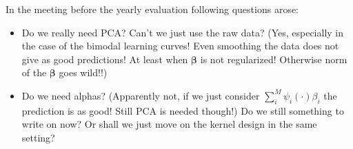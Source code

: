 \documentclass{tran-l}
\theoremstyle{definition}
\theoremstyle{remark}
\numberwithin{equation}{section}
\begin{document}
In the meeting before the yearly evaluation following questions arose:
\begin{itemize}
  \item Do we really need PCA? Can't we just use the raw data? (Yes, especially in the case of the bimodal learning curves! Even smoothing the data does not give as good predictions! At least when $\mathbf{\beta}$ is not regularized! Otherwise norm of the $\mathbf{\beta}$ goes wild!!)
  \item Do we need alphas? (Apparently not, if we just consider $\sum_i^M\psi_i(\cdot)\beta_i$ the prediction is as good! Still PCA is needed though!) Do we still something to write on now? Or shall we just move on the kernel design in the same setting?
\end{itemize}
\end{document}
